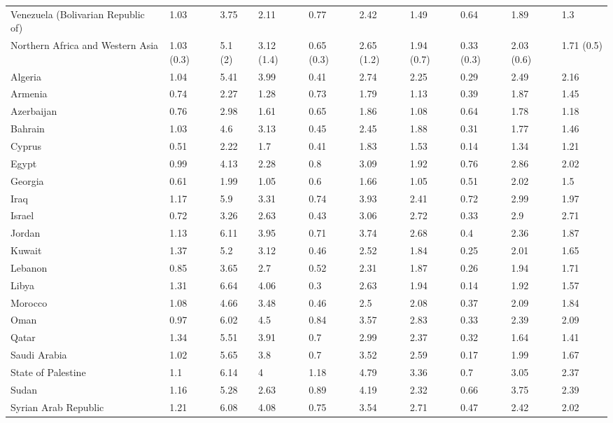 \begin{longtable}[t]{llllllllll}
Venezuela (Bolivarian Republic of) & 1.03 & 3.75 & 2.11 & 0.77 & 2.42 & 1.49 & 0.64 & 1.89 & 1.3\\
\addlinespace
Northern Africa and Western Asia & 1.03 (0.3) & 5.1 (2) & 3.12 (1.4) & 0.65 (0.3) & 2.65 (1.2) & 1.94 (0.7) & 0.33 (0.3) & 2.03 (0.6) & 1.71 (0.5)\\
Algeria & 1.04 & 5.41 & 3.99 & 0.41 & 2.74 & 2.25 & 0.29 & 2.49 & 2.16\\
Armenia & 0.74 & 2.27 & 1.28 & 0.73 & 1.79 & 1.13 & 0.39 & 1.87 & 1.45\\
Azerbaijan & 0.76 & 2.98 & 1.61 & 0.65 & 1.86 & 1.08 & 0.64 & 1.78 & 1.18\\
Bahrain & 1.03 & 4.6 & 3.13 & 0.45 & 2.45 & 1.88 & 0.31 & 1.77 & 1.46\\
\addlinespace
Cyprus & 0.51 & 2.22 & 1.7 & 0.41 & 1.83 & 1.53 & 0.14 & 1.34 & 1.21\\
Egypt & 0.99 & 4.13 & 2.28 & 0.8 & 3.09 & 1.92 & 0.76 & 2.86 & 2.02\\
Georgia & 0.61 & 1.99 & 1.05 & 0.6 & 1.66 & 1.05 & 0.51 & 2.02 & 1.5\\
Iraq & 1.17 & 5.9 & 3.31 & 0.74 & 3.93 & 2.41 & 0.72 & 2.99 & 1.97\\
Israel & 0.72 & 3.26 & 2.63 & 0.43 & 3.06 & 2.72 & 0.33 & 2.9 & 2.71\\
\addlinespace
Jordan & 1.13 & 6.11 & 3.95 & 0.71 & 3.74 & 2.68 & 0.4 & 2.36 & 1.87\\
Kuwait & 1.37 & 5.2 & 3.12 & 0.46 & 2.52 & 1.84 & 0.25 & 2.01 & 1.65\\
Lebanon & 0.85 & 3.65 & 2.7 & 0.52 & 2.31 & 1.87 & 0.26 & 1.94 & 1.71\\
Libya & 1.31 & 6.64 & 4.06 & 0.3 & 2.63 & 1.94 & 0.14 & 1.92 & 1.57\\
Morocco & 1.08 & 4.66 & 3.48 & 0.46 & 2.5 & 2.08 & 0.37 & 2.09 & 1.84\\
\addlinespace
Oman & 0.97 & 6.02 & 4.5 & 0.84 & 3.57 & 2.83 & 0.33 & 2.39 & 2.09\\
Qatar & 1.34 & 5.51 & 3.91 & 0.7 & 2.99 & 2.37 & 0.32 & 1.64 & 1.41\\
Saudi Arabia & 1.02 & 5.65 & 3.8 & 0.7 & 3.52 & 2.59 & 0.17 & 1.99 & 1.67\\
State of Palestine & 1.1 & 6.14 & 4 & 1.18 & 4.79 & 3.36 & 0.7 & 3.05 & 2.37\\
Sudan & 1.16 & 5.28 & 2.63 & 0.89 & 4.19 & 2.32 & 0.66 & 3.75 & 2.39\\
\addlinespace
Syrian Arab Republic & 1.21 & 6.08 & 4.08 & 0.75 & 3.54 & 2.71 & 0.47 & 2.42 & 2.02\\

\end{longtable}
